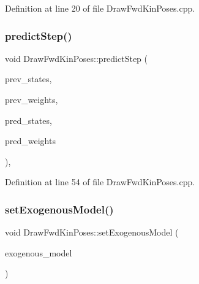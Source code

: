 Definition at line 20 of file Draw\+Fwd\+Kin\+Poses.\+cpp.

\mbox{\label{classbfl_1_1DrawFwdKinPoses_a2b2766e81769769fb299f31f644d1761}} 
\subsubsection{\texorpdfstring{predict\+Step()}{predictStep()}}
{\footnotesize\ttfamily void Draw\+Fwd\+Kin\+Poses\+::predict\+Step (\begin{DoxyParamCaption}\item[{const Eigen\+::\+Ref$<$ const Eigen\+::\+Matrix\+Xf $>$ \&}]{prev\+\_\+states,  }\item[{const Eigen\+::\+Ref$<$ const Eigen\+::\+Vector\+Xf $>$ \&}]{prev\+\_\+weights,  }\item[{Eigen\+::\+Ref$<$ Eigen\+::\+Matrix\+Xf $>$}]{pred\+\_\+states,  }\item[{Eigen\+::\+Ref$<$ Eigen\+::\+Vector\+Xf $>$}]{pred\+\_\+weights }\end{DoxyParamCaption})\hspace{0.3cm}{\ttfamily [override]}, {\ttfamily [protected]}}



Definition at line 54 of file Draw\+Fwd\+Kin\+Poses.\+cpp.

\mbox{\label{classbfl_1_1DrawFwdKinPoses_ad42f7b9870d3f38faa439acc0bd793c7}} 
\subsubsection{\texorpdfstring{set\+Exogenous\+Model()}{setExogenousModel()}}
{\footnotesize\ttfamily void Draw\+Fwd\+Kin\+Poses\+::set\+Exogenous\+Model (\begin{DoxyParamCaption}\item[{std\+::unique\+\_\+ptr$<$ Exogenous\+Model $>$}]{exogenous\+\_\+model }\end{DoxyParamCaption})\hspace{0.3cm}{\ttfamily [override]}}



